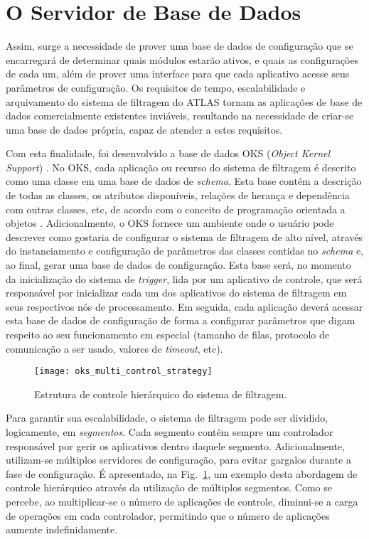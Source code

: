 \section{O Servidor de Base de Dados}
\label{sec:oks}

Assim, surge a necessidade de prover uma base de dados de configuração que se encarregará de determinar quais módulos estarão ativos, e quais as configurações de cada um, além de prover uma interface para que cada aplicativo acesse seus parâmetros de configuração. Os requisitos de tempo, escalabilidade e arquivamento do sistema de filtragem do ATLAS tornam as aplicações de base de dados comercialmente existentes inviáveis, resultando na necessidade de criar-se uma base de dados própria, capaz de atender a estes requisitos. 

Com esta finalidade, foi desenvolvido a base de dados OKS (\emph{Object Kernel Support}) \cite{bib:oks}. No OKS, cada aplicação ou recurso do sistema de filtragem é descrito como uma classe em uma base de dados de \emph{schema}. Esta base contém a descrição de todas as classes, os atributos disponíveis, relações de herança e dependência com outras classes, etc, de acordo com o conceito de programação orientada a objetos \cite{bib:poo}. Adicionalmente, o OKS fornece um ambiente onde o usuário pode descrever como gostaria de configurar o sistema de filtragem de alto nível, através do instanciamento e configuração de parâmetros das classes contidas no \emph{schema} e, ao final, gerar uma base de dados de configuração. Esta base será, no momento da inicialização do sistema de \emph{trigger}, lida por um aplicativo de controle, que será responsável por inicializar cada um dos aplicativos do sistema de filtragem em seus respectivos nós de processamento. Em seguida, cada aplicação deverá acessar esta base de dados de configuração de forma a configurar parâmetros que digam respeito ao seu funcionamento em especial (tamanho de filas, protocolo de comunicação a ser usado, valores de \emph{timeout}, etc).  

\begin{figure}
\begin{center}
\texttt{[image: oks\_multi\_control\_strategy]}
\caption{Estrutura de controle hierárquico do sistema de filtragem.}
\label{fig:multi_control}
\end{center}
\end{figure}

Para garantir sua escalabilidade, o sistema de filtragem pode ser dividido, logicamente, em \emph{segmentos}. Cada segmento contém sempre um controlador responsável por gerir os aplicativos dentro daquele segmento. Adicionalmente, utilizam-se múltiplos servidores de configuração, para evitar gargalos durante a fase de configuração. É apresentado, na Fig.~\ref{fig:multi_control}, um exemplo desta abordagem de controle hierárquico através da utilização de múltiplos segmentos. Como se percebe, ao multiplicar-se o número de aplicações de controle, diminui-se a carga de operações em cada controlador, permitindo que o número de aplicações aumente indefinidamente.  

